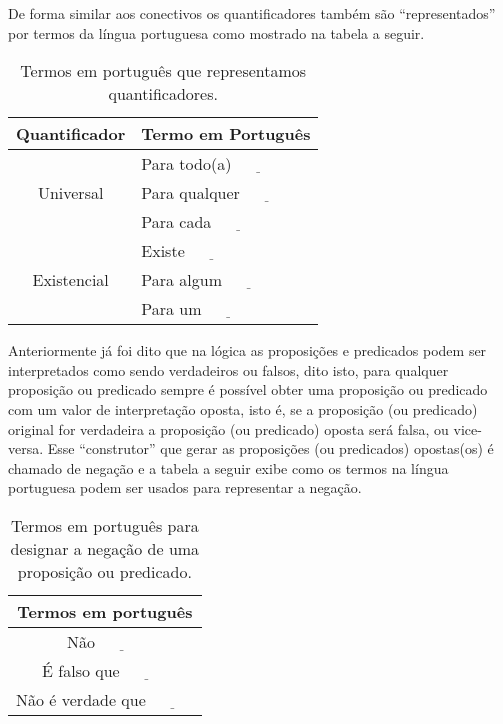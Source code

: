 De forma similar aos conectivos os quantificadores também são ``representados'' por termos da língua portuguesa como mostrado na tabela a seguir.

\begin{table}[h]
	\centering
	\begin{tabular}{cl}
		\hline
		\textbf{Quantificador}  & \textbf{Termo em Portugu\^es} \\ \hline
		\multirow{3}{*}{Universal}    & Para todo(a) $\underline{ \ \ \ \ \ \ \ \ \ \ \ \ }$\\
		& Para qualquer $\underline{ \ \ \ \ \ \ \ \ \ \ \ \ }$\\
		& Para cada $\underline{ \ \ \ \ \ \ \ \ \ \ \ \ }$\\ \hline
		\multirow{3}{*}{Existencial} & Existe $\underline{ \ \ \ \ \ \ \ \ \ \ \ \ }$\\
		& Para algum $\underline{ \ \ \ \ \ \ \ \ \ \ \ \ }$\\
		& Para um $\underline{ \ \ \ \ \ \ \ \ \ \ \ \ }$\\ \hline
	\end{tabular}
	\caption{Termos em português que representamos quantificadores.}
	\label{tab:QuantificadoresPT-BR}
\end{table}

Anteriormente já foi dito que na lógica as proposições e predicados podem ser interpretados como sendo verdadeiros ou falsos, dito isto, para qualquer proposição ou predicado sempre é possível obter uma proposição ou predicado com um valor de interpretação oposta, isto é, se a proposição (ou predicado) original for verdadeira a proposição (ou predicado) oposta será falsa, ou vice-versa. Esse ``construtor'' que gerar as proposições (ou predicados) opostas(os) é chamado de negação e a tabela a seguir exibe como os termos na língua portuguesa podem ser usados para representar a negação.

\begin{table}[h]
	\centering
	\begin{tabular}{c}
		\hline
		\textbf{Termos em português}\\
		\hline
		Não $\underline{ \ \ \ \ \ \ \ \ \ \ \ \ }$ \\
		É falso que $\underline{ \ \ \ \ \ \ \ \ \ \ \ \ }$\\
		Não é verdade que $\underline{ \ \ \ \ \ \ \ \ \ \ \ \ }$ \\ \hline
	\end{tabular}
	\caption{Termos em português para designar a negação de uma proposição ou predicado.}
	\label{tab:NegacaoPortugues}
\end{table}

